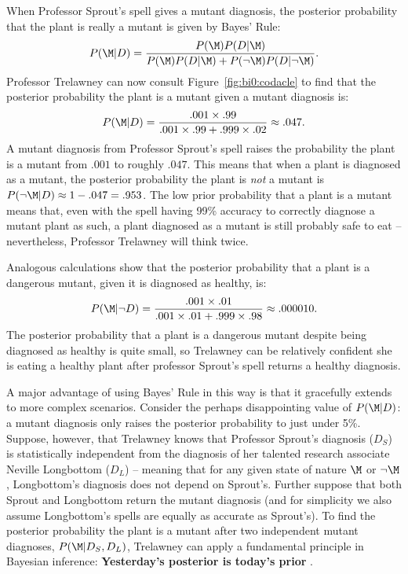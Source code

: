When Professor Sprout's spell gives a mutant diagnosis, the posterior probability that the plant is really a mutant is given by Bayes' Rule:
$$
P(\M|D) = \frac{P(\M)P(D|\M)}{P(\M)P(D|\M) + P(\neg \M)P(D|\neg \M)}.
$$
Professor Trelawney can now consult 
Figure~\ref{fig:bi0:codacle} to find that the posterior probability the plant is a mutant given a mutant diagnosis is:
$$
P(\M|D) = \frac{.001 \times .99}{.001 \times .99 + .999\times .02} \approx .047.
$$
A mutant diagnosis from Professor Sprout's spell raises the probability the plant is a mutant from $.001$ to roughly $.047$. This means that when a plant is diagnosed as a mutant, the posterior probability the plant is \textit{not} a mutant is $P(\neg \M|D) \approx 1 - .047 = .953$. The low prior probability that a plant is a mutant means that, even with the spell having 99\% accuracy to correctly diagnose a mutant plant as such, a plant diagnosed as a mutant is still probably safe to eat -- nevertheless, Professor Trelawney will think twice.

Analogous calculations show that the posterior probability that a plant is a dangerous mutant, given it is diagnosed as healthy, is:
$$
P(\M|\neg D) = \frac{.001 \times .01}{.001 \times .01 + .999\times .98} \approx .000010.
$$
The posterior probability that a plant is a dangerous mutant despite being diagnosed as healthy is quite small, so Trelawney can be relatively confident she is eating a healthy plant after professor Sprout's spell returns a healthy diagnosis.

A major advantage of using Bayes' Rule in this way is that it gracefully extends to more complex scenarios.  Consider the perhaps disappointing value of $P(\M|D)$: a mutant diagnosis only raises the posterior probability to just under 5\%.  Suppose, however, that Trelawney knows that Professor Sprout's diagnosis ($D_S$) is statistically independent from the diagnosis of her {talented} research associate Neville Longbottom ($D_L$) {-- meaning that for any given state of nature $\M$ or $\neg{\M}$, Longbottom's diagnosis does not depend on Sprout's. Further}  suppose that both Sprout and Longbottom return the mutant diagnosis (and for simplicity we also assume Longbottom's spells are equally as accurate as Sprout's). To find the posterior probability the plant is a mutant after two independent mutant diagnoses, $P(\M|D_S, D_L)$, Trelawney can apply a fundamental principle in Bayesian inference: \textbf{Yesterday's posterior is today's prior} {\cite{Lindley2000}}. 

